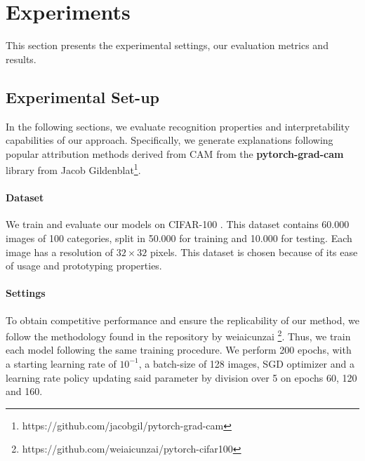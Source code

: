 \section{Experiments}
This section presents the experimental settings, our evaluation metrics and results.



\subsection{Experimental Set-up}
In the following sections, we evaluate recognition properties and interpretability capabilities of 
our approach. Specifically, we generate explanations following popular attribution methods derived 
from CAM \autocite{zhou2016learning} from the \textbf{pytorch-grad-cam} library from Jacob 
Gildenblat\footnote{https://github.com/jacobgil/pytorch-grad-cam}.

\paragraph{Dataset}
We train and evaluate our models on CIFAR-100 \cite{krizhevsky2009learning}. This dataset contains 
60.000 images of 100 categories, split in 50.000 for training and 10.000 for testing. Each image 
has a resolution of $32\times32$ pixels. This dataset is chosen because of its ease of usage and 
prototyping properties. 

\paragraph{Settings}
To obtain competitive performance and ensure the replicability of our method, we follow the 
methodology found in the repository by weiaicunzai 
\footnote{https://github.com/weiaicunzai/pytorch-cifar100}. Thus, we train each model following the 
same training procedure. We perform 200 epochs, with a starting learning rate of $10^{-1}$, a 
batch-size of 128 images, SGD optimizer and a learning rate policy updating said parameter by 
division over 5 on epochs 60, 120 and 160.  
